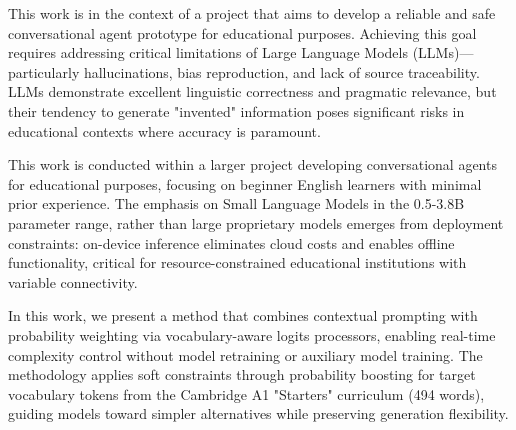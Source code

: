 \documentclass[10pt, a4paper]{article}
\begin{document}

This work is in the context of a project that aims to develop a reliable and safe conversational agent prototype for educational purposes.
Achieving this goal requires addressing critical limitations of Large Language Models (LLMs)—particularly hallucinations, bias reproduction, and lack of source traceability.
LLMs demonstrate excellent linguistic correctness and pragmatic relevance, but their tendency to generate "invented" information poses significant risks in educational contexts where accuracy is paramount.


This work is conducted within a larger project developing conversational agents for educational purposes, focusing on beginner English learners with minimal prior experience. The emphasis on Small Language Models \cite{fang2024survey} in the 0.5-3.8B parameter range, rather than large proprietary models emerges from deployment constraints: on-device inference eliminates cloud costs and enables offline functionality, critical for resource-constrained educational institutions with variable connectivity.


In this work, we present a method that combines contextual prompting with probability weighting via vocabulary-aware logits processors, enabling real-time complexity control without model retraining or auxiliary model training. The methodology applies soft constraints through probability boosting for target vocabulary tokens from the Cambridge A1 "Starters" curriculum (494 words), guiding models toward simpler alternatives while preserving generation flexibility.
\end{document}
